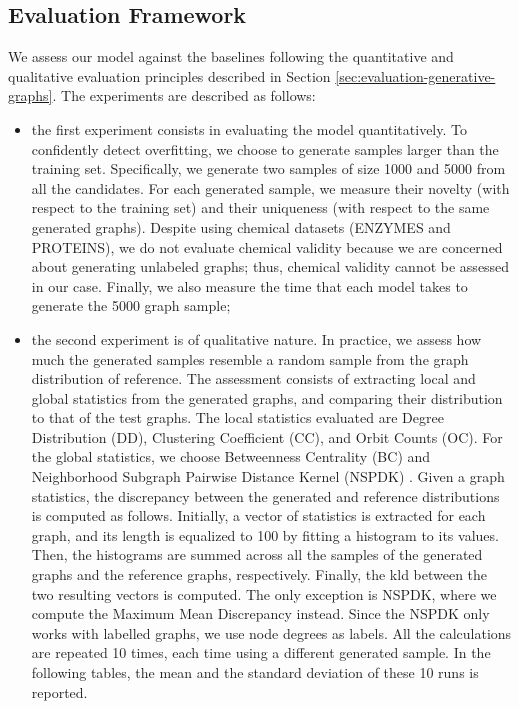 \subsection{Evaluation Framework}
We assess our model against the baselines following the quantitative and qualitative evaluation principles described in Section \ref{sec:evaluation-generative-graphs}. The experiments are described as follows:
\begin{itemize}
    \item the first experiment consists in evaluating the model quantitatively. To confidently detect overfitting, we choose to generate samples larger than the training set. Specifically, we generate two samples of size 1000 and 5000 from all the candidates. For each generated sample, we measure their novelty (with respect to the training set) and their uniqueness (with respect to the same generated graphs). Despite using chemical datasets (ENZYMES and PROTEINS), we do not evaluate chemical validity because we are concerned about generating unlabeled graphs; thus, chemical validity cannot be assessed in our case. Finally, we also measure the time that each model takes to generate the 5000 graph sample;
    \item the second experiment is of qualitative nature. In practice, we assess how much the generated samples resemble a random sample from the graph distribution of reference. The assessment consists of extracting local and global statistics from the generated graphs, and comparing their distribution to that of the test graphs. The local statistics evaluated are Degree Distribution (DD), Clustering Coefficient (CC), and Orbit Counts (OC). For the global statistics, we choose Betweenness Centrality (BC) and Neighborhood Subgraph Pairwise Distance Kernel (NSPDK) \cite{costa2010nspdk}. Given a graph statistics, the discrepancy between the generated and reference distributions is computed as follows. Initially, a vector of statistics is extracted for each graph, and its length is equalized to 100 by fitting a histogram to its values. Then, the histograms are summed across all the samples of the generated graphs and the reference graphs, respectively. Finally, the \gls{kld} between the two resulting vectors is computed. The only exception is NSPDK, where we compute the Maximum Mean Discrepancy \cite{gretton2012mmdkernel} instead. Since the NSPDK only works with labelled graphs, we use node degrees as labels. All the calculations are repeated 10 times, each time using a different generated sample. In the following tables, the mean and the standard deviation of these 10 runs is reported.
\end{itemize}

